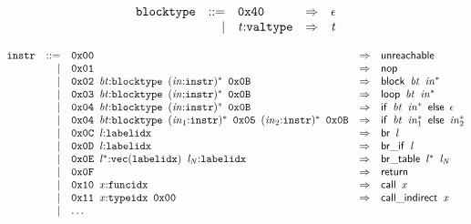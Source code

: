 \vspace{1ex}

\vspace{1ex}

$$
\begin{array}{@{}l@{}rrlll@{}l@{}}
& {\mathtt{blocktype}} &::=& \mathtt{0x40} &\Rightarrow& \epsilon \\ &&|&
{\mathit{t}}{:}{\mathtt{valtype}} &\Rightarrow& {\mathit{t}} \\
\end{array}
$$

\vspace{1ex}

$$
\begin{array}{@{}l@{}rrlll@{}l@{}}
& {\mathtt{instr}} &::=& \mathtt{0x00} &\Rightarrow& \mathsf{unreachable} \\ &&|&
\mathtt{0x01} &\Rightarrow& \mathsf{nop} \\ &&|&
\mathtt{0x02}~\,{\mathit{bt}}{:}{\mathtt{blocktype}}~\,{({\mathit{in}}{:}{\mathtt{instr}})^\ast}~\,\mathtt{0x0B} &\Rightarrow& \mathsf{block}~\,{\mathit{bt}}~\,{{\mathit{in}}^\ast} \\ &&|&
\mathtt{0x03}~\,{\mathit{bt}}{:}{\mathtt{blocktype}}~\,{({\mathit{in}}{:}{\mathtt{instr}})^\ast}~\,\mathtt{0x0B} &\Rightarrow& \mathsf{loop}~\,{\mathit{bt}}~\,{{\mathit{in}}^\ast} \\ &&|&
\mathtt{0x04}~\,{\mathit{bt}}{:}{\mathtt{blocktype}}~\,{({\mathit{in}}{:}{\mathtt{instr}})^\ast}~\,\mathtt{0x0B} &\Rightarrow& \mathsf{if}~\,{\mathit{bt}}~\,{{\mathit{in}}^\ast}~\,\mathsf{else}~\,\epsilon \\ &&|&
\mathtt{0x04}~\,{\mathit{bt}}{:}{\mathtt{blocktype}}~\,{({\mathit{in}}_{{1}}{:}{\mathtt{instr}})^\ast}~\,\mathtt{0x05}~\,{({\mathit{in}}_{{2}}{:}{\mathtt{instr}})^\ast}~\,\mathtt{0x0B} &\Rightarrow& \mathsf{if}~\,{\mathit{bt}}~\,{{\mathit{in}}_{{1}}^\ast}~\,\mathsf{else}~\,{{\mathit{in}}_{{2}}^\ast} \\ &&|&
\mathtt{0x0C}~\,{\mathit{l}}{:}{\mathtt{labelidx}} &\Rightarrow& \mathsf{br}~\,{\mathit{l}} \\ &&|&
\mathtt{0x0D}~\,{\mathit{l}}{:}{\mathtt{labelidx}} &\Rightarrow& \mathsf{br\_if}~\,{\mathit{l}} \\ &&|&
\mathtt{0x0E}~\,{{\mathit{l}}^\ast}{:}{\mathtt{vec}}({\mathtt{labelidx}})~\,{\mathit{l}}_{{\mathit{N}}}{:}{\mathtt{labelidx}} &\Rightarrow& \mathsf{br\_table}~\,{{\mathit{l}}^\ast}~\,{\mathit{l}}_{{\mathit{N}}} \\ &&|&
\mathtt{0x0F} &\Rightarrow& \mathsf{return} \\ &&|&
\mathtt{0x10}~\,{\mathit{x}}{:}{\mathtt{funcidx}} &\Rightarrow& \mathsf{call}~\,{\mathit{x}} \\ &&|&
\mathtt{0x11}~\,{\mathit{x}}{:}{\mathtt{typeidx}}~\,\mathtt{0x00} &\Rightarrow& \mathsf{call\_indirect}~\,{\mathit{x}} \\ &&|&
\dots \\
\end{array}
$$

